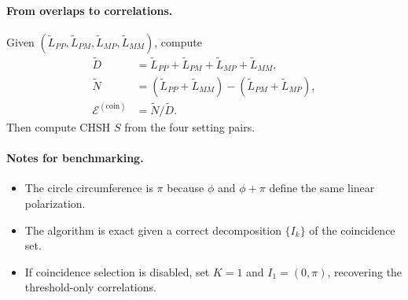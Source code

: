 \paragraph{From overlaps to correlations.}
Given $(\tilde L_{PP},\tilde L_{PM},\tilde L_{MP},\tilde L_{MM})$, compute
\begin{align}
\tilde D &= \tilde L_{PP}+\tilde L_{PM}+\tilde L_{MP}+\tilde L_{MM},\\
\tilde N &= (\tilde L_{PP}+\tilde L_{MM})-(\tilde L_{PM}+\tilde L_{MP}),\\
\mathcal{E}^{(\mathrm{coin})} &= \tilde N/\tilde D.
\end{align}
Then compute CHSH $S$ from the four setting pairs.

\paragraph{Notes for benchmarking.}
\begin{itemize}
    \item The circle circumference is $\pi$ because $\phi$ and $\phi+\pi$ define the same linear polarization.
    \item The algorithm is exact given a correct decomposition $\{I_k\}$ of the coincidence set.
    \item If coincidence selection is disabled, set $K=1$ and $I_1=(0,\pi)$, recovering the threshold-only correlations.
\end{itemize}
